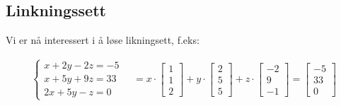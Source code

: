 \documentclass[11pt, a4paper, norsk]{article}
\begin{document}
        \subsection{Linkningssett}%
        \label{sub:linkningssett}
        
        Vi er nå interessert i å løse likningsett, f.eks:
        
        \begin{align*}
            \begin{cases}
                x + 2y - 2z = -5 \\
                x + 5y + 9z = 33 \\
                2x + 5y -z = 0
            \end{cases} \quad = x \cdot \begin{bmatrix}
                1 \\
                1 \\
                2
            \end{bmatrix} + y \cdot \begin{bmatrix}
                2 \\
                5 \\
                5
            \end{bmatrix} + z \cdot \begin{bmatrix}
                -2 \\
                9 \\
                -1
            \end{bmatrix} = \begin{bmatrix}
                -5 \\
                33 \\
                0
            \end{bmatrix}
        \end{align*}
            
\end{document}
